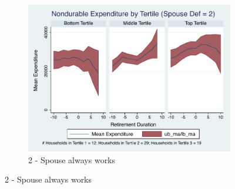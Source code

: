 \documentclass[11pt,onecolumn]{article}
\numberwithin{figure}{section}
\begin{document}
\begin{figure}
\begin{subfigure}{1.0\textwidth}
	\caption{2 - Spouse always works}
	\centering
	\includegraphics[width=0.8\linewidth]{../ConsumptionPostRetirement_by_SpouseDef/Smoothed/spouse_def_2.pdf}
	\end{subfigure}
	\vspace{1cm}
	

\end{figure}
\end{document}
